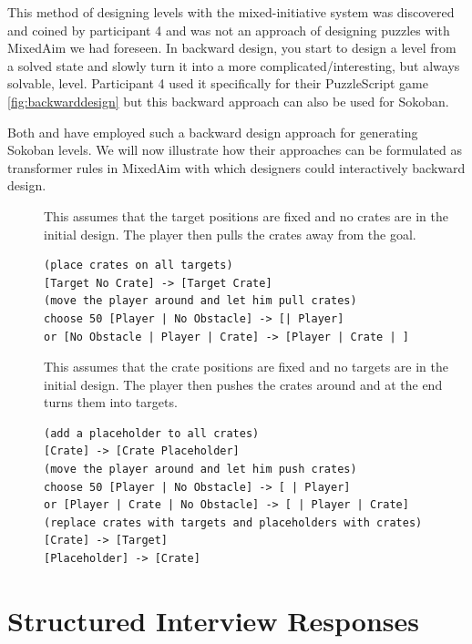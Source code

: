 This method of designing levels with the mixed-initiative system was discovered and coined by participant 4 and was not an approach of designing puzzles with MixedAim we had foreseen. In backward design, you start to design a level from a solved state and slowly turn it into a more complicated/interesting, but always solvable, level.
Participant 4 used it specifically for their PuzzleScript game \ref{fig:backwarddesign} but this backward approach can also be used for Sokoban. 


Both \cite{Taylor2011} and \cite{Kartal2015} have employed such a backward design approach for generating Sokoban levels. We will now illustrate how their approaches can be formulated as transformer rules in MixedAim with which designers could interactively backward design.

\begin{description}
\item[\cite{Taylor2011}] This assumes that the target positions are fixed and no crates are in the initial design. The player then pulls the crates away from the goal.
\begin{lstlisting}
(place crates on all targets)
[Target No Crate] -> [Target Crate]
(move the player around and let him pull crates)
choose 50 [Player | No Obstacle] -> [| Player]
or [No Obstacle | Player | Crate] -> [Player | Crate | ]    
\end{lstlisting}

\item[\cite{Kartal2015}] This assumes that the crate positions are fixed and no targets are in the initial design. The player then pushes the crates around and at the end turns them into targets.

\begin{lstlisting}
(add a placeholder to all crates)
[Crate] -> [Crate Placeholder]
(move the player around and let him push crates)
choose 50 [Player | No Obstacle] -> [ | Player]
or [Player | Crate | No Obstacle] -> [ | Player | Crate] 
(replace crates with targets and placeholders with crates)
[Crate] -> [Target]
[Placeholder] -> [Crate]
\end{lstlisting}
\end{description}

\section{Structured Interview Responses}

